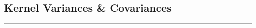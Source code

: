 \documentclass[letterpaper,10pt]{article}
\numberwithin{equation}{section}
\numberwithin{thm}{section}
\numberwithin{lem}{section}
\numberwithin{cor}{section}
\newcommand{\E}{\mathbb{E}}
\newcommand{\1}{\mathbbm{1}}
\begin{document}

\newpage
\subsection{Kernel Variances \& Covariances}
\hrule
\end{document}
